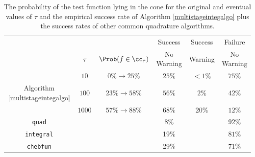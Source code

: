 \documentclass{iitthesis}
\theoremstyle{definition}
\theoremstyle{remark}
\begin{document}

\begin{table}[h]
\centering
\begin{tabular}{cccccc}
&&&Success & Success & Failure \\
& $\tau$ &  $\Prob(f \in \cc_{\tau}) $ & No Warning & Warning & No Warning \\
\toprule
&$10$ & $0\% \rightarrow  25\% $ & $25\%$ & $<1\%$ & $75\%$  \\
Algorithm \ref{multistageintegalgo}
 &$100$ & $23 \% \rightarrow 58\% $ & $56\%$ & $2\%$ & $42\%$ \\
&$1000$ & $57\% \rightarrow 88\% $& $68\%$ & $20\%$ &$12\%$ \\
\midrule
{\tt quad} & & & 8\% & & $92\%$\\
{\tt integral} & & & 19\% & & $81\%$\\
{\tt chebfun} & & &29\% & & $71\%$\\
\end{tabular}
\caption{The probability of the test function lying in the cone for the original and eventual values of $\tau$ and the empirical success rate of Algorithm \ref{multistageintegalgo} plus the success rates of other common quadrature algorithms. \label{integresultstable}}
\end{table}
\end{document}

